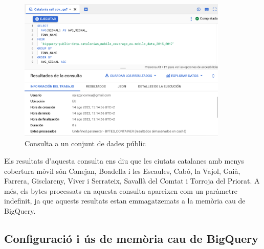 \documentclass[12pt,longbibliography]{article}
\theoremstyle{definition}
\theoremstyle{remark}
\begin{document}
\vspace{2mm}
\begin{figure}[h!]
\begin{center}
\includegraphics[width=10cm]{bq23}
\end{center}
\caption{Consulta a un conjunt de dades públic}
\label{fig:bq23}
\end{figure}
\vspace{2mm}

Els resultats d'aquesta consulta ens diu que les ciutats catalanes amb menys cobertura mòvil són Canejan, Boadella i les Escaules, Cabó, la Vajol, Gaià, Farrera, Gisclareny, Viver i Serrateix, Savallà del Comtat i Torroja del Priorat. A més, els bytes processats en aquesta consulta apareixen com un paràmetre indefinit, ja que aquests resultats estan emmagatzemats a la memòria cau de BigQuery.

\subsection{Configuració i ús de memòria cau de BigQuery}
\end{document}

